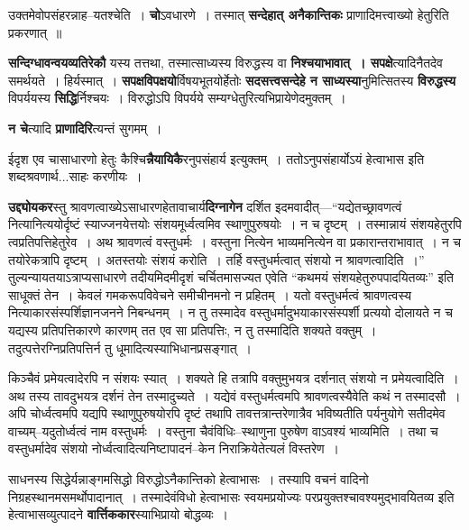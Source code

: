 \documentclass[article,12pt,a4paper]{memoir}
\begin{document}
	  \pstart उक्तमेवोपसंहरन्नाह--यतश्चेति । \textbf{चो}ऽवधारणे । तस्मात् \textbf{सन्देहात् अनैकान्तिकः} प्राणादिमत्त्वाख्यो हेतुरिति प्रकरणात् ॥
	\pend
      

	  \pstart \textbf{सन्दिग्धावन्वयव्यतिरेकौ} यस्य तत्तथा, तस्मात्साध्यस्य विरुद्धस्य वा \textbf{निश्चयाभावात् । सपक्षे}त्यादि\leavevmode{}नैतदेव समर्थयते । हिर्यस्मात् । \textbf{सपक्षविपक्षयो}र्विषयभूतयोर्हेतोः \textbf{सदसत्त्वसन्देहे न साध्यस्या}नुमित्सितस्य \textbf{विरुद्धस्य} विपर्ययस्य \textbf{सिद्धि}र्निश्चयः । विरुद्धोऽपि विपर्यये सम्यग्धेतुरित्यभिप्रायेणेदमुक्तम् ।
	\pend
      

	  \pstart \textbf{न चे}त्यादि \textbf{प्राणादिरि}त्यन्तं सुगमम् ।
	\pend
      

	  \pstart ईदृश एव चासाधारणो हेतुः कैश्चि\textbf{न्नैयायिकै}रनुपसंहार्य इत्युक्तम् । ततोऽनुपसंहार्योऽयं हेत्वाभास इति शब्दश्रवणार्थ...साहः करणीयः ।
	\pend
      

	  \pstart \textbf{उद्द्योयकर}स्तु श्रावणत्वाख्येऽसाधारणहेतावाचार्य\textbf{दिग्नागेन} दर्शित इदमवादीत्—“यद्येतच्छ्रावणत्वं नित्यानित्ययोर्दृष्टं स्याज्जनयेत्तयोः संशयमूर्ध्वत्वमिव स्थाणुपुरुषयोः । न च दृष्टम् । तस्मान्नायं संशयहेतुरपि त्वप्रतिपत्तिहेतुरेव । अथ श्रावणत्वं वस्तुधर्मः । वस्तुना नित्येन भाव्यमनित्येन वा प्रकारान्तराभावात् । न च तयोरेकत्रापि दृष्टम् । अतस्तयोः संशयं करोति । तर्हि वस्तुधर्मत्वात् संशयो न श्रावणत्वादिति ।” तुल्यन्यायतयाऽत्राप्यसाधारणे तदीयमिदमीदृशं चर्चितमासज्यत एवेति “कथमयं संशयहेतुरुपपादयितव्यः” इति साधूक्तं तेन । केवलं गमकरूपविवेचने समीचीनमनो न प्रहितम् । यतो वस्तुधर्मत्वं श्रावणत्वस्य नित्याकारसंस्पर्शिज्ञानजनने निबन्धनम् । न तु तस्मादेव वस्तुधर्मादुभयाकारसंस्पर्शी प्रत्ययो दोलायते न च यद्यस्य प्रतिपत्तिकारणे कारणम् तत एव सा प्रतिपत्तिः, न तु तस्मादिति शक्यते वक्तुम् । तदुत्पत्तेरग्निप्रतिपत्तिर्न तु धूमादित्यस्याभिधानप्रसङ्गात् ।
	\pend
      \leavevmode{}

	  \pstart किञ्चैवं प्रमेयत्वादेरपि न संशयः स्यात् । शक्यते हि तत्रापि वक्तुमुभयत्र दर्शनात् संशयो न प्रमेयत्वादिति । अथ तस्य तावदुभयत्र दर्शनं तेन तस्मादुच्यते । यद्येवं वस्तुधर्मत्वमपि श्रावणत्वस्यैवेति कथं न तस्मादसौ । अपि चोर्ध्वत्वमपि यद्यपि स्थाणुपुरुषयोरपि दृष्टं तथापि तावत्तत्रान्तरेणात्रैव भविष्यतीति पर्यनुयोगे सतीदमेव वाच्यम्--यदुतोर्ध्वत्वं नाम वस्तुधर्मः । वस्तुना चैवंविधिः--स्थाणुना पुरुषेण वाऽवश्यं भाव्यमिति । तथा च वस्तुधर्मादेव संशयो नोर्ध्वत्वादित्यनिष्टापादनं--केन निराक्रियेतेत्यलं विस्तरेण ।
	\pend
      

	  \pstart साधनस्य सिद्धेर्यन्नाङ्गमसिद्धो विरुद्धोऽनैकान्तिको हेत्वाभासः । तस्यापि वचनं वादिनो निग्रहस्थानमसमर्थोपादानात् । तस्मादेवंविधो हेत्वाभासः स्वयमप्रयोज्यः परप्रयुक्तश्चावश्यमुद्भावयितव्य इति हेत्वाभासव्युत्पादने \textbf{वार्त्तिककार}स्याभिप्रायो बोद्धव्यः ।
	\pend
      
\end{document}
